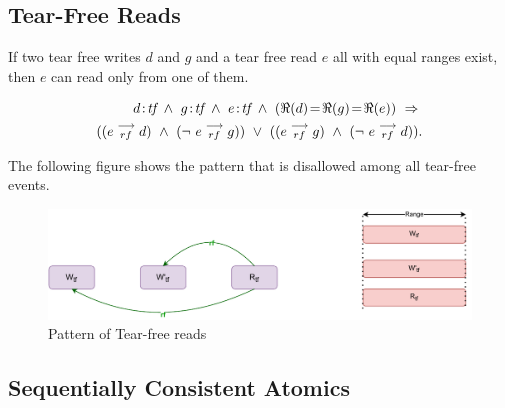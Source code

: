 
        \subsection{Tear-Free Reads} 
            If two tear free writes $d$ and $g$ and a tear free read $e$ all with equal ranges exist, then $e$ can read only from one of them\footnotemark.
                
            \begin{align*}
                \et{d}{tf}\ \wedge\ \et{g}{tf} \ \wedge \ \et{e}{tf} 
                  \ \wedge \ 
                  (\Re(d) \!=\! \Re(g) \!=\! \Re(e)) 
                  \ \Rightarrow{} \\ 
                      ((\reln{e}{rf}{d}) 
                      \ \wedge \ 
                      (\neg \ \reln{e}{rf}{g})) 
                  \ \vee \  
                      ((\reln{e}{rf}{g}) 
                      \ \wedge \
                      (\neg \ \reln{e}{rf}{d})).
            \end{align*}
                    
            The following figure shows the pattern that is disallowed among all tear-free events. 
            \begin{figure}[H]
                \centering
                \includegraphics[scale=0.7]{ECMAScriptMemoryModel/TearFreeReads.pdf}
                \caption{Pattern of Tear-free reads}
            \end{figure}

            
        \subsection{Sequentially Consistent Atomics} 
            
